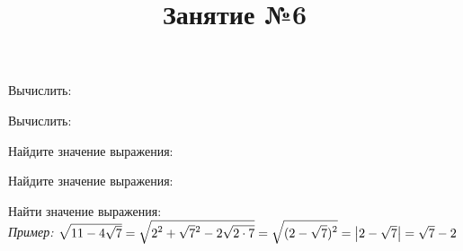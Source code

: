 \begin{listofex}
	\item Вычислить:
	\begin{enumcols}[itemcolumns=3]
		\item {}
		\item {}
		\item {}
		\item {}
		\item {}
		\item {}
	\end{enumcols}
	\item Вычислить:
	\begin{enumcols}[itemcolumns=2]
		\item {}
		\item {}
	\end{enumcols}
	\item Найдите значение выражения:
	\begin{enumcols}[itemcolumns=2]
		\item {}
		\item {}
		\item {}
	\end{enumcols}
	\item Найдите значение выражения:
	\begin{enumcols}[itemcolumns=1]
		\item {}
		\item {}
		\item {}
	\end{enumcols}
	\item {}
	\item Найти значение выражения:\\
	\textit{Пример:} \( \sqrt{11-4\sqrt{7}}=\sqrt{\displaystyle2\mathstrut^2+\sqrt{7}\mathstrut^2-2\sqrt{2\cdot7}}=\sqrt{\displaystyle(2-\sqrt{7})^2}=\left|2-\sqrt{7}\right|=\sqrt{7} - 2 \)
	\begin{enumcols}[itemcolumns=2]
		\item {}
		\item {}
	\end{enumcols}
\end{listofex}
\newpage
\title{Занятие №6}
